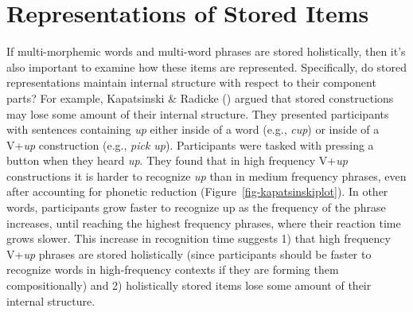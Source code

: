 \documentclass[
  12pt,
  letterpaper,
]{scrreprt}
\begin{document}
\section{Representations of Stored
Items}\label{sec-representations-of-stored-items}

If multi-morphemic words and multi-word phrases are stored holistically,
then it's also important to examine how these items are represented.
Specifically, do stored representations maintain internal structure with
respect to their component parts? For example, Kapatsinski \& Radicke
() argued
that stored constructions may lose some amount of their internal
structure. They presented participants with sentences containing
\emph{up} either inside of a word (e.g., \emph{cup}) or inside of a
V+\emph{up} construction (e.g., \emph{pick up}). Participants were
tasked with pressing a button when they heard \emph{up}. They found that
in high frequency V+\emph{up} constructions it is harder to recognize
\emph{up} than in medium frequency phrases, even after accounting for
phonetic reduction (Figure~\ref{fig-kapatsinskiplot}). In other words,
participants grow faster to recognize up as the frequency of the phrase
increases, until reaching the highest frequency phrases, where their
reaction time grows slower. This increase in recognition time suggests
1) that high frequency V+\emph{up} phrases are stored holistically
(since participants should be faster to recognize words in
high-frequency contexts if they are forming them compositionally) and 2)
holistically stored items lose some amount of their internal structure.
\end{document}
